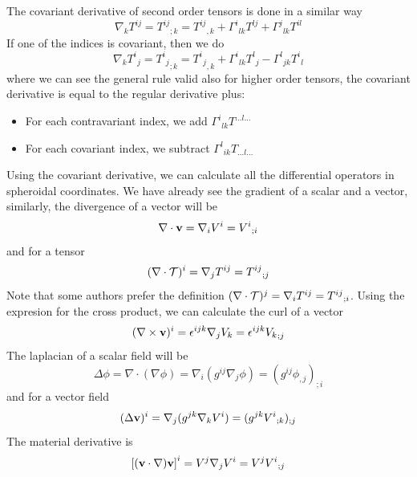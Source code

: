 The covariant derivative of second order tensors is done in a similar way
\begin{equation}
\nabla_kT^{ij}={T^{ij}}_{;k}={T^{ij}}_{,k}+{\Gamma^i}_{lk}T^{lj}+{\Gamma^j}_{lk}T^{il}
\end{equation}
If one of the indices is covariant, then we do
\begin{equation}
\nabla_k{T^i}_j={{T^i}_j}_{;k}={{T^i}_j}_{,k}+{\Gamma^i}_{lk}{T^l}_j-{\Gamma^l}_{jk}{T^i}_l
\end{equation}
where we can see the general rule valid also for higher order tensors, the covariant derivative is equal
to the regular derivative plus:
\begin{itemize}
\item For each contravariant index, we add ${\Gamma^i}_{lk}T^{\ldots l\ldots}$
\item For each covariant index, we subtract ${\Gamma^l}_{ik}T_{\ldots l\ldots}$
\end{itemize}

Using the covariant derivative, we can calculate all the differential operators in spheroidal coordinates.
We have already see the gradient of a scalar and a vector, similarly, the divergence of a vector will be
\begin{equation}
\nabla\cdot\mathbf{v}=\nabla_iV^i={V^i}_{;i}
\end{equation}
and for a tensor
\begin{equation}
(\nabla\cdot\mathcal{T})^i=\nabla_jT^{ij}={T^{ij}}_{;j}
\end{equation}
Note that some authors prefer the definition $(\nabla\cdot\mathcal{T})^j=\nabla_iT^{ij}={T^{ij}}_{;i}$.
Using the expresion for the cross product, we can calculate the curl of a vector
\begin{equation}
(\nabla\times\mathbf{v})^i=\epsilon^{ijk}\nabla_jV_k=\epsilon^{ijk}{V_k}_{;j}
\end{equation}
The laplacian of a scalar field will be
\begin{equation}
\Delta\phi=\nabla\cdot(\nabla\phi)=\nabla_i(g^{ij}\nabla_j\phi)=(g^{ij}\phi_{,j})_{;i}
\end{equation}
and for a vector field
\begin{equation}
(\Delta\mathbf{v})^i=\nabla_j(g^{jk}\nabla_kV^i)=(g^{jk}{V^i}_{;k})_{;j}
\end{equation}
The material derivative is
\begin{equation}
\left[(\mathbf{v}\cdot\nabla)\mathbf{v}\right]^i=V^j\nabla_jV^i=V^j{V^i}_{;j}
\end{equation}

